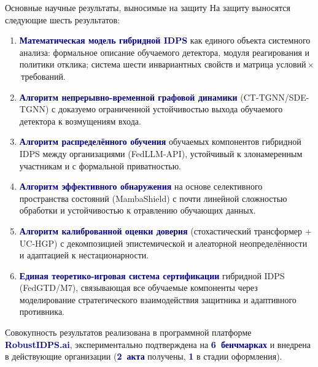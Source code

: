 \documentclass[10pt,aspectratio=169]{beamer}
\newcommand{\bn}[1]{\textcolor{navy}{\textbf{#1}}}
\begin{document}
\begin{frame}{Основные научные результаты, выносимые на защиту}
\footnotesize
На защиту выносятся следующие шесть результатов:
\smallskip
\begin{enumerate}\setlength\itemsep{3pt}
\item \bn{Математическая модель гибридной IDPS} как единого
объекта системного анализа: формальное описание обучаемого
детектора, модуля реагирования и политики отклика;
система шести инвариантных свойств и матрица
условий\,$\times$\,требований.

\item \bn{Алгоритм непрерывно-временной графовой динамики}
(CT-TGNN/SDE-TGNN) с доказуемо ограниченной устойчивостью
выхода обучаемого детектора к возмущениям входа.

\item \bn{Алгоритм распределённого обучения} обучаемых
компонентов гибридной IDPS между организациями
(FedLLM-API), устойчивый к злонамеренным участникам и с
формальной приватностью.

\item \bn{Алгоритм эффективного обнаружения} на основе
селективного пространства состояний (MambaShield) с
почти линейной сложностью обработки и устойчивостью к
отравлению обучающих данных.

\item \bn{Алгоритм калиброванной оценки доверия}
(стохастический трансформер + UC-HGP) с декомпозицией
эпистемической и алеаторной неопределённости и адаптацией
к нестационарности.

\item \bn{Единая теоретико-игровая система сертификации}
гибридной IDPS (FedGTD/M7), связывающая все обучаемые
компоненты через моделирование стратегического
взаимодействия защитника и адаптивного противника.

\end{enumerate}
\smallskip
\begin{block}{}
\footnotesize Совокупность результатов реализована в
программной платформе \bn{RobustIDPS.ai}, экспериментально
подтверждена на \bn{6~бенчмарках} и внедрена в действующие
организации (\bn{2~акта} получены, \bn{1} в стадии
оформления).
\end{block}
\end{frame}
\end{document}
